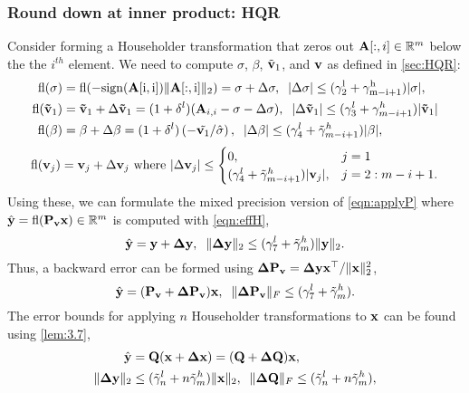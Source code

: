 \subsubsection{Round down at inner product: HQR}
Consider forming a Householder transformation that zeros out $\mathbf{A}[:,i]\in\mathbb{R}^m$ below the the $i^{th}$ element. 
We need to compute $\sigma$, $\beta$, $\tilde{\mathbf{v}}_1$, and $\mathbf{v}$ as defined in \cref{sec:HQR}:
\begin{align}
\fl(\sigma) &= \rm{fl}(-\rm{sign}(\bb{A}[i,i])\|\bb{A}[:,i]\|_2) = \sigma + \Delta \sigma,\;\;|\Delta\sigma| \leq (\gamma_{2}^l+\gamma_{m-i+1}^h)|\sigma|,\label{eqn:mpsigma}\\
\fl(\bb{\tilde{v}}_1)& =\bb{\tilde{v}}_1 + \Delta \bb{\tilde{v}}_1 = (1+\dd^l) (\bb{A}_{i,i}-\sigma-\Delta\sigma), \;\;|\Delta\bb{\tilde{v}}_1| \leq (\gamma_{3}^l+\gamma_{m-i+1}^h)|\bb{\tilde{v}}_1| \label{eqn:mpv1}\\
\fl(\beta) &= \beta +\Delta \beta= (1+\dd^l)\left(-\tilde{\bb{v}_1}/\hat{\sigma}\right), \;\; |\Delta\beta| \leq (\gamma_{4}^l+\tilde{\gamma}_{m-i+1}^h)|\beta|, \label{eqn:mpbeta}
\end{align}
\begin{equation}
	\fl(\bb{v}_j)	= \bb{v}_j + \Delta \bb{v}_j\text{ where }|\Delta \bb{v}_j|\leq 
	\begin{cases}
	0,& j=1\\
	(\gamma_{4}^l + \tilde{\gamma}_{m-i+1}^h)|\bb{v}_j|,&j=2:m-i+1.
	\end{cases}  \label{eqn:mpv}
\end{equation}
Using these, we can formulate the mixed precision version of \cref{eqn:applyP} where $\hat{\mathbf{y}}=\mathrm{fl}(\mathbf{P_vx})\in\mathbb{R}^m$ is computed with \cref{eqn:effH},
\begin{equation}
	\hat{\mathbf{y}} = \mathbf{y}+\mathbf{\Delta y},\;\; \|\mathbf{\Delta y}\|_2 \leq (\gamma_7^l + \tilde{\gamma}_{m}^h)\|\mathbf{y}\|_2.
\end{equation}
Thus, a backward error can be formed using $\mathbf{\Delta P_v} = \mathbf{\Delta y}\mathbf{x}^{
\top}/\|\mathbf{x}\|_2^2$,
\begin{equation}
	\hat{\mathbf{y}} = (\mathbf{P_v} + \mathbf{\Delta P_v})\mathbf{x},\;\; \|\mathbf{\Delta P_v}\|_F\leq (\gamma_7^l + \tilde{\gamma}_{m}^h).
\end{equation}
The error bounds for applying $n$ Householder transformations to $\mathbf{x}$ can be found using \cref{lem:3.7},
\begin{align}
\hat{\bb{y}} &= \bb{Q} (\bb{x} +\bb{\Delta x}) = (\bb{Q} + \bb{\Delta Q})\bb{x},\\
\|\bb{\Delta y}\|_2 &\leq (\tilde{\gamma}_n^l+n\tilde{\gamma}_m^h)\|\bb{x}\|_2,\;\; \|\bb{\Delta Q}\|_F\leq (\tilde{\gamma}_n^l+n\tilde{\gamma}_m^h),\label{eqn:mp19.3}
\end{align} 
